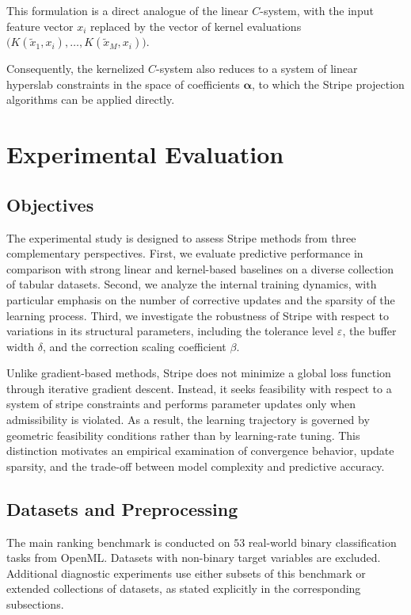 \documentclass[a4paper,fleqn]{cas-sc}
\begin{document}
This formulation is a direct analogue of the linear $C$-system,
with the input feature vector $x_i$
replaced by the vector of kernel evaluations
$\bigl(K(\tilde{x}_1,x_i),\dots,K(\tilde{x}_M,x_i)\bigr)$.

Consequently, the kernelized $C$-system also reduces to a system
of linear hyperslab constraints
in the space of coefficients $\boldsymbol{\alpha}$,
to which the Stripe projection algorithms can be applied directly.


\section{Experimental Evaluation}
\label{sec:experiments}

\subsection{Objectives}

The experimental study is designed to assess Stripe methods from three complementary perspectives. 
First, we evaluate predictive performance in comparison with strong linear and kernel-based baselines on a diverse collection of tabular datasets. 
Second, we analyze the internal training dynamics, with particular emphasis on the number of corrective updates and the sparsity of the learning process. 
Third, we investigate the robustness of Stripe with respect to variations in its structural parameters, including the tolerance level $\varepsilon$, the buffer width $\delta$, and the correction scaling coefficient $\beta$.

Unlike gradient-based methods, Stripe does not minimize a global loss function through iterative gradient descent. 
Instead, it seeks feasibility with respect to a system of stripe constraints and performs parameter updates only when admissibility is violated. 
As a result, the learning trajectory is governed by geometric feasibility conditions rather than by learning-rate tuning. 
This distinction motivates an empirical examination of convergence behavior, update sparsity, and the trade-off between model complexity and predictive accuracy.


\subsection{Datasets and Preprocessing}
\label{subsec:datasets-preprocessing}

The main ranking benchmark is conducted on $53$ real-world binary classification tasks from OpenML. Datasets with non-binary target variables are excluded. Additional diagnostic experiments use either subsets of this benchmark or extended collections of datasets, as stated explicitly in the corresponding subsections.
\end{document}
